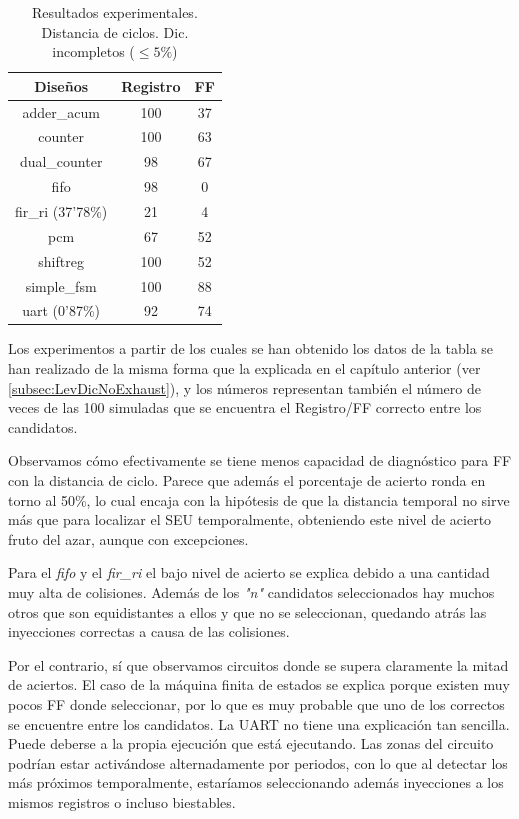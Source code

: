 \begin{table}[htbp]
    \ttabbox
    {\caption{Resultados experimentales. Distancia de ciclos. Dic.
    incompletos ($\leq5\%$)}
    \label{tab:CycleRes}}
    {
        \begin{tabular}{c|c c}
            \hline
            \rule[-8pt]{0pt}{22pt}{\bfseries{Diseños}}&{\bfseries{Registro}}
            &{\bfseries{\gls{FF}}} \\
            \hline
            \rule{0pt}{14pt}adder\_acum & 100 & 37\\
            counter & 100 & 63\\
            dual\_counter & 98 & 67\\
            fifo & 98 & 0\\
            fir\_ri (37'78\%) & 21 & 4\\
            pcm & 67 & 52\\
            shiftreg & 100 & 52\\
            simple\_fsm & 100 & 88\\
            uart (0'87\%) & 92 & 74\\
            \hline
        \end{tabular}
    }
\end{table}

Los experimentos a partir de los cuales se han obtenido los datos de la tabla se
han realizado de la misma forma que la explicada en el capítulo anterior
(ver \ref{subsec:LevDicNoExhaust}), y los números representan también el número de
veces de las 100 simuladas que se encuentra el Registro/FF correcto entre los
candidatos.

Observamos cómo efectivamente se tiene menos capacidad de diagnóstico para 
\gls{FF} con la distancia de ciclo. Parece que además el porcentaje de acierto
ronda en torno al 50\%, lo cual encaja con la hipótesis de que la distancia
temporal no sirve más que para localizar el \gls{SEU} temporalmente, obteniendo
este nivel de acierto fruto del azar, aunque con excepciones.

Para el \textit{fifo} y el \textit{fir\_ri} el bajo nivel de acierto se explica
debido a una cantidad muy alta de colisiones. Además de los \textit{"n"} 
candidatos seleccionados hay muchos otros que son equidistantes a ellos y que no
se seleccionan, quedando atrás las inyecciones correctas a causa de las
colisiones.

Por el contrario, sí que observamos circuitos donde se supera claramente la mitad
de aciertos. El caso de la máquina finita de estados se explica porque existen muy
pocos \gls{FF} donde seleccionar, por lo que es muy probable que uno de los
correctos se encuentre entre los candidatos. La \gls{UART} no tiene una
explicación tan sencilla. Puede deberse a la propia ejecución que está ejecutando.
Las zonas del circuito podrían estar activándose alternadamente por periodos, con
lo que al detectar los más próximos temporalmente, estaríamos seleccionando además
inyecciones a los mismos registros o incluso biestables.

\endinput
